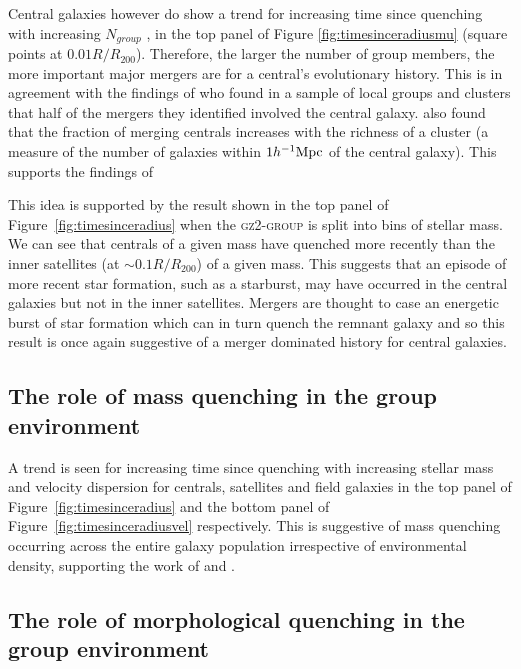 Central galaxies however do show a trend for increasing time since quenching with increasing $N_{group}$ , in the top panel of Figure \ref{fig:timesinceradiusmu} (square points at $0.01 R/R_{200}$). Therefore, the larger the number of group members, the more important major mergers are for a central's evolutionary history. This is in agreement with the findings of \citet{mcintosh08} who found in a sample of local groups and clusters that half of the mergers they identified involved the central galaxy. \cite{liu09} also found that the fraction of merging centrals increases with the richness of a cluster (a measure of the number of galaxies within $1h^{-1}\rm{Mpc}$ of the central galaxy). This supports the findings of \citet{lin10, ellison10, lidman13}

This idea is supported by the result shown in the top panel of Figure~\ref{fig:timesinceradius} when the \textsc{gz2-group} is split into bins of stellar mass. We can see that centrals of a given mass have quenched more recently than the inner satellites (at $\sim0.1R/R_{200}$) of a given mass. This suggests that an episode of more recent star formation, such as a starburst, may have occurred in the central galaxies but not in the inner satellites. Mergers are thought to case an energetic burst of star formation which can in turn quench the remnant galaxy \citep[][as discussed in Section \ref{rapid}]{hopkins05, treister12, pontzen16} and so this result is once again suggestive of a merger dominated history for central galaxies. 

\subsection{The role of mass quenching in the group environment}\label{sec:rolemassenv}

A trend is seen for increasing time since quenching with increasing stellar mass and velocity dispersion for centrals, satellites and field galaxies in the top panel of Figure~\ref{fig:timesinceradius} and the bottom panel of Figure~\ref{fig:timesinceradiusvel} respectively. This is suggestive of mass quenching occurring across the entire galaxy population irrespective of environmental density, supporting the work of \citet{peng10, peng12, Gabor10} and \citet{darvish16}.

\subsection{The role of morphological quenching in the group environment}\label{sec:rolemorphenv}

